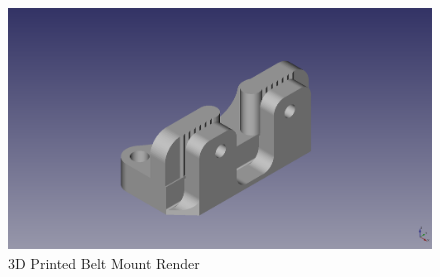 \begin{figure}[H]
\centering
\includegraphics[keepaspectratio=true,angle=0,height=1.0\textheight,width=1.0\textwidth]{STL/beltmount.stl.png}
\caption{3D Printed Belt Mount Render}
\label{fig:beltmountrender}
\end{figure}

